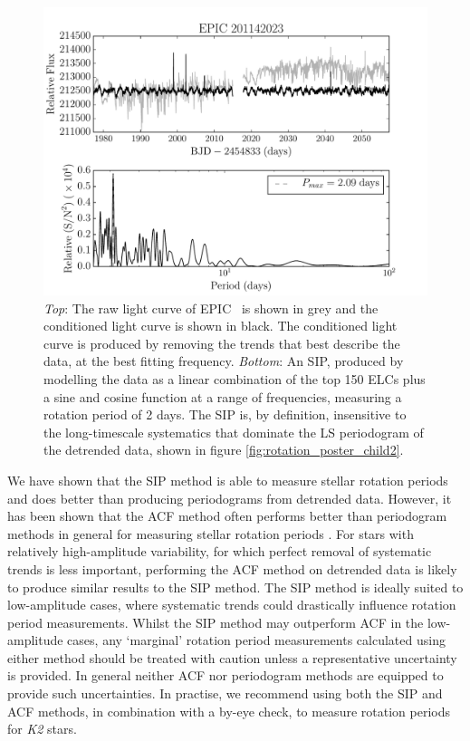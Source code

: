 \begin{figure}
\begin{center}
\includegraphics[width=6in, clip=true]{figures/K2_rotation_201142023.pdf}
\caption[Example 2: A SIP with a conditioned light curve.]
{{\it Top}: The raw light curve of EPIC \rpcc\ is shown in grey and
	the conditioned light curve is shown in black. The conditioned light
	curve is produced by removing the trends that best describe the
	data, at the best fitting frequency.
	{\it Bottom}: An SIP, produced by modelling the data as a linear
	combination of the top 150 ELCs plus a sine and cosine function at a
	range of frequencies, measuring a rotation period of 2 days.
	The SIP is, by definition, insensitive to the long-timescale
	systematics that dominate the LS periodogram of the detrended data,
	shown in figure \ref{fig:rotation_poster_child2}.}
\label{fig:K2_rotation_poster_child2}
\end{center}
\end{figure}

We have shown that the SIP method is able to measure stellar rotation periods
and does better than producing periodograms from detrended data.
However, it has been shown that the ACF method often performs better than
periodogram methods in general for measuring stellar rotation periods
\citep[][]{Mcquillan2013, Mcquillan2014, Mazeh2015}.
For stars with relatively high-amplitude variability, for which perfect
removal of systematic trends is less important, performing the ACF method
on detrended data is likely to produce similar results to the SIP method.
The SIP method is ideally suited to low-amplitude cases, where systematic
trends could drastically influence rotation period measurements.
Whilst the SIP method may outperform ACF in the low-amplitude cases,
any `marginal' rotation period measurements calculated using either method
should be treated with caution unless a representative uncertainty is provided.
In general neither ACF nor periodogram methods are equipped to provide
such uncertainties.
In practise, we recommend using both the SIP and ACF methods, in combination
with a by-eye check, to measure rotation periods for {\it K2} stars.

